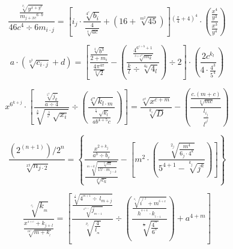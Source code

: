 \documentclass[aspectratio=169]{beamer}
\begin{document}

\begin{frame}
\fontsize{60pt}{60pt}

$$ \frac{\frac{\sqrt[x_i]{y^{x+y^2}}}{{m_{j+{x}{c}}}^{6\cdot b}}}{46{c}^{4}\div{6}{m}_{i \cdot j}} =\left[i_{j}\cdot \frac{\sqrt[4^c]{b_i}}{\frac{4}{\sqrt[4]{ac}}}+
\left(16+\sqrt[m^2]{45}\right)
\right]{^{\left(\frac{x}{4} + 4\right)^4}} \cdot \left(\frac{\frac{x^4}{y^3}}{\frac{x^3}{y^4}}\right)$$

\end{frame}


\begin{frame}
\fontsize{60pt}{60pt}

$$ a\cdot\left(\sqrt[b^3]{c_{i\cdot j}}+d \right)= \left[ \frac{\frac{\sqrt[4]{b^3}}{2+m_i}}{\frac{4\pi^{4\pi}}{\sqrt[\pi]{2}}} - \left( \frac{\frac{4^{6^{c \div b}+1}}{\sqrt[3+c^4]{m_k}}}{\frac{k}{l} \div \sqrt[4_k]{4_l}} \right) \div 2 \right] \cdot \left( \frac{2c^{k_l}}{4 \cdot \frac{4^3}{5^4}} \right) $$

\end{frame}


\begin{frame}
\fontsize{60pt}{60pt}

$$ x^{6^{k+j}}\cdot\left[\frac{\frac{\sqrt[5^{4}]{j_{k}}}{a\div 4}}{\sqrt[\frac{b}{c}]{\sqrt[\frac{3}{b^{2}} \ \  \ \ \ \ \ ]{x_{i}}}}\div \left( \frac{\sqrt[4^{m}]{k_{l \cdot m}}}{\frac{\sqrt[\frac{6}{4} \ \  \ \ \ \ \ ]{k_{l}}}{ab^{4+5}c}} \right)\right] = \frac{\sqrt[c^{x}]{x^{c+m}}}{\sqrt[k_{i}]{D}} - \left( \frac{\frac{c.(m+c)}{\sqrt[3]{mc}}}{\frac{l_{i_{j}}}{l^{i^{j}}}} \right) $$

\end{frame}


\begin{frame}
\fontsize{60pt}{60pt}

$$\frac{\left(2^{(n+1)}\right)/2^n}{\sqrt[x^y]{n_{j\cdot2}}}=
\left\lbrace \frac{\frac{x^{2+k_j}}{a^b \div b_c}}
{\frac{\sqrt[m\div k]{\frac{\sqrt[3]{m}}{15^c \cdot m_{j-k}}}}{\sqrt[2^k]{c_k}}} - 
\left[m^2\cdot\left(\frac{\sqrt[2_j]{\frac{m^4}{6_j \cdot 4^k}}}{5^{4+1} - \sqrt[k_j]{j^k}}\right)\right]\right\rbrace$$

\end{frame}


\begin{frame}
\fontsize{60pt}{60pt}

$$\frac{\sqrt[^{c_j}]{k_{_m}}}{\frac{x^{^{4+c}}+k_{j+l}}{\sqrt[m^{^4}]{m+k_{_l}}}} = \left[ \frac{\frac{\sqrt[^\frac{k}{m}]{4^{^{m+1}}\div \, l_{m+j}}}{\sqrt[^{k^{m+1}}]{j_{_{m-1}}}}}{\sqrt[^{p_j}]{\frac{4}{l_{_m}}}}\div \left( \frac{\frac{\sqrt[^{k_i}]{i^{^{j\cdot l}}+m^{^{6+x}}}}{h^{^{4+4}}\cdot k_{_{l-1}}}}{\sqrt[^{\frac{1}{m}}]{\frac{4^{^{m}}}{6^{^{n}}}}}\right)+a^{4+m}\right]$$

\end{frame}
\end{document}
